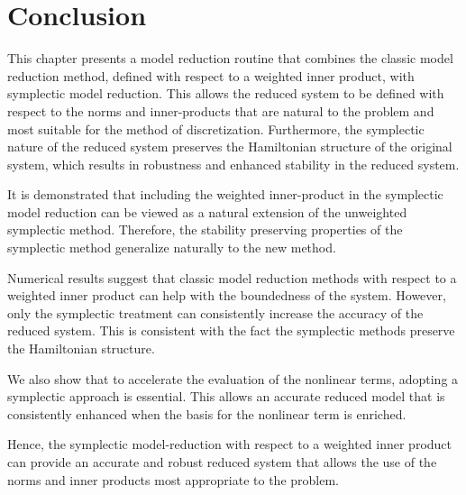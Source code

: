 \section{Conclusion} \label{sec:conc}
This chapter presents a model reduction routine that combines the classic model reduction method, defined with respect to a weighted inner product, with symplectic model reduction. This allows the reduced system to be defined with respect to the norms and inner-products that are natural to the problem and most suitable for the method of discretization. Furthermore, the symplectic nature of the reduced system preserves the Hamiltonian structure of the original system, which results in robustness and enhanced stability in the reduced system.

It is demonstrated that including the weighted inner-product in the symplectic model reduction can be viewed as a natural extension of the unweighted symplectic method. Therefore, the stability preserving properties of the symplectic method generalize naturally to the new method.

Numerical results suggest that classic model reduction methods with respect to a weighted inner product can help with the boundedness of the system. However, only the symplectic treatment can consistently increase the accuracy of the reduced system. This is consistent with the fact the symplectic methods preserve the Hamiltonian structure.

We also show that to accelerate the evaluation of the nonlinear terms, adopting a symplectic approach is essential. This allows an accurate reduced model that is consistently enhanced when the basis for the nonlinear term is enriched.

Hence, the symplectic model-reduction with respect to a weighted inner product can provide an accurate and robust reduced system that allows the use of the norms and inner products most appropriate to the problem.
